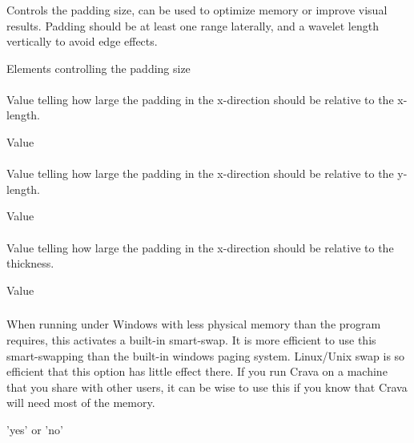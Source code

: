 \subsubsection{}
 \slist
   \item \Description Controls the padding size, can be used to optimize memory or improve visual results. Padding should be at least one range laterally, and a wavelet length vertically to avoid edge effects.
   \item \Argument Elements controlling the padding size
   \item \Default
 \elist

\paragraph{}
 \slist
   \item \Description Value telling how large the padding in the x-direction should be relative to the x-length. %
   \item \Argument Value
   \item {}
 \elist

\paragraph{}
 \slist
   \item \Description Value telling how large the padding in the x-direction should be relative to the y-length.
   \item \Argument Value
   \item {}
 \elist

\paragraph{}
 \slist
   \item \Description Value telling how large the padding in the x-direction should be relative to the thickness.
   \item \Argument Value
   \item {}
 \elist

\subsubsection{} 
 \slist
   \item \Description When running under Windows with less physical
     memory than the program requires, this activates a built-in
     smart-swap. It is more efficient to use this smart-swapping than
     the built-in windows paging system. Linux/Unix swap is so
     efficient that this option has little effect there. If you run
     Crava on a machine that you share with other users, it can be
     wise to use this if you know that Crava will need most of the
     memory.
   \item \Argument 'yes' or 'no'
   \item \Default
 \elist

